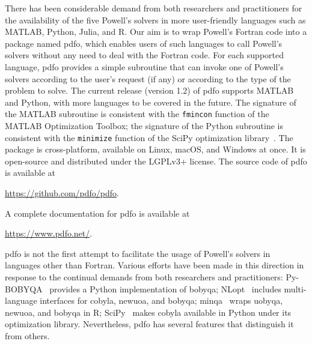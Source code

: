 There has been considerable demand from both researchers and practitioners for the availability of the five Powell's solvers in more user-friendly languages such as MATLAB, Python, Julia, and R.
Our aim is to wrap Powell's Fortran code into a package named \gls{pdfo}, which enables users of such languages to call Powell's solvers without any need to deal with the Fortran code.
For each supported language, \gls{pdfo} provides a simple subroutine that can invoke one of Powell's solvers according to the user's request (if any) or according to the type of the problem to solve.
The current release (version 1.2) of \gls{pdfo} supports MATLAB and Python, with more languages to be covered in the future.
The signature of the MATLAB subroutine is consistent with the \texttt{fmincon} function of the MATLAB Optimization Toolbox; the signature of the Python subroutine is consistent with the \texttt{minimize} function of the SciPy optimization library~\cite{Virtanen_Etal_2020}.
The package is cross-platform, available on Linux, macOS, and Windows at once.
It is open-source and distributed under the LGPLv3+ license.
The source code of \gls{pdfo} is available at
\begin{center}
    \url{https://github.com/pdfo/pdfo}.
\end{center}
A complete documentation for \gls{pdfo} is available at
\begin{center}
    \url{https://www.pdfo.net/}.
\end{center}

\Gls{pdfo} is not the first attempt to facilitate the usage of Powell's solvers in languages other than Fortran.
Various efforts have been made in this direction in response to the continual demands from both researchers and practitioners: Py-BOBYQA~\cite{Cartis_Etal_2019} provides a Python implementation of \gls{bobyqa}; NLopt~\cite{Johnson_2019} includes multi-language interfaces for \gls{cobyla}, \gls{newuoa}, and \gls{bobyqa}; minqa~\cite{Bates_Etal_2014} wraps \gls{uobyqa}, \gls{newuoa}, and \gls{bobyqa} in R; SciPy~\cite{Virtanen_Etal_2020} makes \gls{cobyla} available in Python under its optimization library.
Nevertheless, \gls{pdfo} has several features that distinguish it from others.


